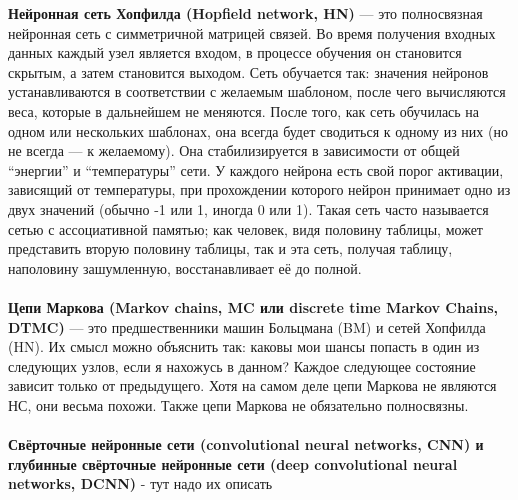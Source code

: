 \textbf{Нейронная сеть Хопфилда (Hopfield network, HN)} — это полносвязная нейронная сеть с симметричной матрицей связей. Во время получения входных данных каждый узел является входом, в процессе обучения он становится скрытым, а затем становится выходом. Сеть обучается так: значения нейронов устанавливаются в соответствии с желаемым шаблоном, после чего вычисляются веса, которые в дальнейшем не меняются. После того, как сеть обучилась на одном или нескольких шаблонах, она всегда будет сводиться к одному из них (но не всегда — к желаемому). Она стабилизируется в зависимости от общей “энергии” и “температуры” сети. У каждого нейрона есть свой порог активации, зависящий от температуры, при прохождении которого нейрон принимает одно из двух значений (обычно -1 или 1, иногда 0 или 1).  Такая сеть часто называется сетью с ассоциативной памятью; как человек, видя половину таблицы, может представить вторую половину таблицы, так и эта сеть, получая таблицу, наполовину зашумленную, восстанавливает её до полной. \\ \\

\textbf{Цепи Маркова (Markov chains, MC или discrete time Markov Chains, DTMC)} — это предшественники машин Больцмана (BM) и сетей Хопфилда (HN). Их смысл можно объяснить так: каковы мои шансы попасть в один из следующих узлов, если я нахожусь в данном? Каждое следующее состояние зависит только от предыдущего. Хотя на самом деле цепи Маркова не являются НС, они весьма похожи. Также цепи Маркова не обязательно полносвязны. \\ \\

\textbf{Свёрточные нейронные сети (convolutional neural networks, CNN) и глубинные свёрточные нейронные сети (deep convolutional neural networks, DCNN)} - тут надо их описать
